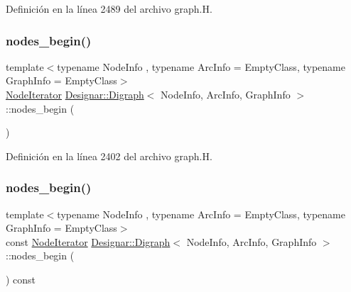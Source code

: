 Definición en la línea 2489 del archivo graph.\+H.

\mbox{\label{class_designar_1_1_digraph_af2a2ede7d4af852e67705f2c2bf394d2}} 
\subsubsection{\texorpdfstring{nodes\+\_\+begin()}{nodes\_begin()}\hspace{0.1cm}{\footnotesize\ttfamily [1/2]}}
{\footnotesize\ttfamily template$<$typename Node\+Info , typename Arc\+Info  = Empty\+Class, typename Graph\+Info  = Empty\+Class$>$ \\
\hyperlink{class_designar_1_1_digraph_1_1_node_iterator}{Node\+Iterator} \hyperlink{class_designar_1_1_digraph}{Designar\+::\+Digraph}$<$ Node\+Info, Arc\+Info, Graph\+Info $>$\+::nodes\+\_\+begin (\begin{DoxyParamCaption}{ }\end{DoxyParamCaption})\hspace{0.3cm}{\ttfamily [inline]}}



Definición en la línea 2402 del archivo graph.\+H.

\mbox{\label{class_designar_1_1_digraph_a6fcecdd41bdd4af1a0e1a7a5a3e8a3eb}} 
\subsubsection{\texorpdfstring{nodes\+\_\+begin()}{nodes\_begin()}\hspace{0.1cm}{\footnotesize\ttfamily [2/2]}}
{\footnotesize\ttfamily template$<$typename Node\+Info , typename Arc\+Info  = Empty\+Class, typename Graph\+Info  = Empty\+Class$>$ \\
const \hyperlink{class_designar_1_1_digraph_1_1_node_iterator}{Node\+Iterator} \hyperlink{class_designar_1_1_digraph}{Designar\+::\+Digraph}$<$ Node\+Info, Arc\+Info, Graph\+Info $>$\+::nodes\+\_\+begin (\begin{DoxyParamCaption}{ }\end{DoxyParamCaption}) const\hspace{0.3cm}{\ttfamily [inline]}}




